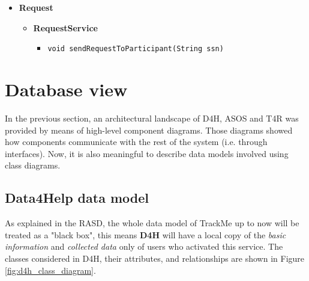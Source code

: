 \documentclass[a4paper, hidelinks, 12pt]{report}
\begin{document}
\begin{itemize}
		\item{\textbf{Request}}
			\begin{itemize}
				\item{\textbf{RequestService}}
					\begin{itemize}
						\item{\verb|void sendRequestToParticipant(String ssn)|}
					\end{itemize}
			\end{itemize}
	\end{itemize}		
	
	\section{Database view}
In the previous section, an architectural landscape of D4H, ASOS and T4R was provided by means of high-level component diagrams. Those diagrams showed how components communicate with the rest of the system (i.e. through interfaces). Now, it is also meaningful to describe data models involved using class diagrams. 
	
	\subsection{Data4Help data model}
	As explained in the RASD, the whole data model of TrackMe up to now will be treated as a "black box", this means \textbf{D4H} will have a local copy of the \textit{basic information} and \textit{collected data} only of users who activated this service. The classes considered in D4H, their attributes, and relationships are shown in Figure \ref{fig:d4h_class_diagram}.
	
\end{document}
